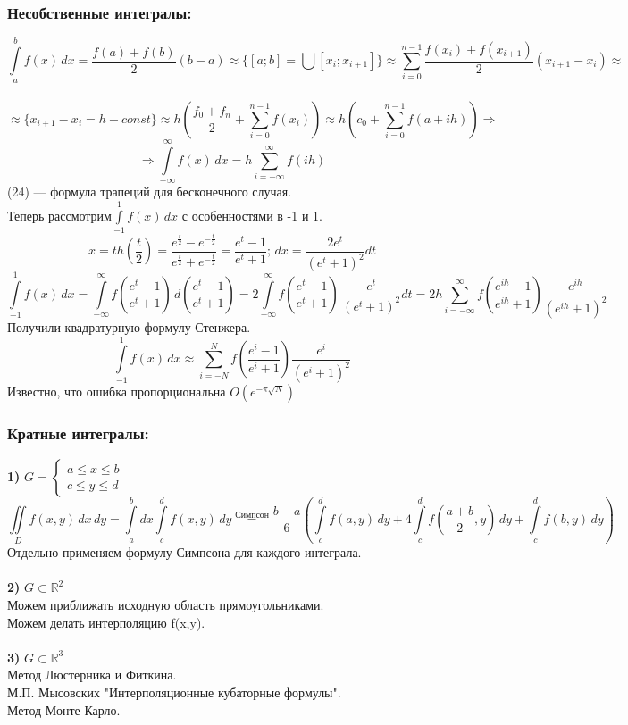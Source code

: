 \subsubsection{Несобственные интегралы:}
\[
\int\limits_{a}^{b} f(x) \, dx = \frac{f(a)+f(b)}{2}(b-a) \approx \{[a;b] = \bigcup[x_i;x_{i+1}]\} \approx \sum\limits_{i=0}^{n-1}\frac{f(x_i)+f(x_{i+1})}{2}(x_{i+1}-x_i) \approx
\]\\
\[
\approx \{x_{i+1}-x_i=h -const\} \approx h(\frac{f_0+f_n}{2} + \sum\limits_{i=0}^{n-1}f(x_i))\approx h(c_0 + \sum\limits_{i=0}^{n-1}f(a+ih)) \Rightarrow
\]
\begin{equation}
\Rightarrow \int\limits_{-\infty}^{\infty} f(x) \, dx = h\sum\limits_{i=-\infty}^{\infty}f(ih)
\end{equation}
(24) --- формула трапеций  для бесконечного случая.\\
Теперь рассмотрим$\int\limits_{-1}^{1} f(x) \, dx $ с особенностями в -1 и 1.\\
\[
x = th(\frac{t}{2}) = \frac{e^{\frac{t}{2}}-e^{-\frac{t}{2}}}{e^{\frac{t}{2}} + e^{-\frac{t}{2}}} = \frac{e^t-1}{e^t+1}; \,dx = \frac{2e^t}{(e^t+1)^2}dt
\]
\[
\int\limits_{-1}^{1} f(x) \, dx = \int\limits_{-\infty}^{\infty} f(\frac{e^t-1}{e^t+1}) \, d\left(\frac{e^t-1}{e^t+1}\right) = 2\int\limits_{-\infty}^{\infty} f(\frac{e^t-1}{e^t+1}) \, \frac{e^t}{(e^t+1)^2}dt = 2h \sum\limits_{i=-\infty}^{\infty}f(\frac{e^{ih}-1}{e^{ih}+1})\frac{e^{ih}}{(e^{ih}+1)^2}
\]
Получили квадратурную формулу Стенжера.\\
\[
\int\limits_{-1}^{1} f(x) \, dx  \approx \sum\limits_{i=-N}^{N}f(\frac{e^{i}-1}{e^{i}+1})\frac{e^{i}}{(e^{i}+1)^2}
\]
Известно, что ошибка пропорциональна $O(e^{-\pi\sqrt{N}})$
\subsubsection{Кратные интегралы:}
\textbf{1)}
$
G = \begin{cases}
a\leq x\leq b\\
c\leq y \leq d
\end{cases}
$
\[
\iint\limits_{D} f(x,y) \, dx \, dy = \int\limits_{a}^{b}dx\int\limits_{c}^{d}f(x,y)\,dy \overset{Симпсон}{=} \frac{b-a}{6}\left(\int\limits_{c}^{d}f(a,y)\,dy + 4\int\limits_{c}^{d}f(\frac{a+b}{2},y)\,dy + \int\limits_{c}^{d}f(b,y)\,dy\right)
\]
Отдельно применяем формулу Симпсона для каждого интеграла.\\
\\
\textbf{2)}
$G \subset 	\mathbb{R}^2$\\
Можем приближать исходную область прямоугольниками.\\
Можем делать интерполяцию f(x,y).\\
\\
\textbf{3)}
$G \subset 	\mathbb{R}^3$\\
Метод Люстерника и Фиткина.\\
М.П. Мысовских "Интерполяционные кубаторные формулы".\\
Метод Монте-Карло.
